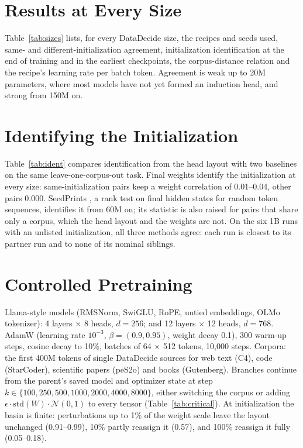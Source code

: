 \documentclass[11pt]{article}
\begin{document}
\section{Results at Every Size}
\label{app:sizes}

Table~\ref{tab:sizes} lists, for every DataDecide size, the recipes and seeds used, same- and different-initialization agreement, initialization identification at the end of training and in the earliest checkpoints, the corpus-distance relation and the recipe's learning rate per batch token.
Agreement is weak up to 20M parameters, where most models have not yet formed an induction head, and strong from 150M on.

\section{Identifying the Initialization}
\label{app:ident}

Table~\ref{tab:ident} compares identification from the head layout with two baselines on the same leave-one-corpus-out task.
Final weights identify the initialization at every size: same-initialization pairs keep a weight correlation of 0.01--0.04, other pairs 0.000.
SeedPrints \citep{tong2026seedprints}, a rank test on final hidden states for random token sequences, identifies it from 60M on; its statistic is also raised for pairs that share only a corpus, which the head layout and the weights are not.
On the six 1B runs with an unlisted initialization, all three methods agree: each run is closest to its partner run and to none of its nominal siblings.

\section{Controlled Pretraining}
\label{app:controlled}
Llama-style models (RMSNorm, SwiGLU, RoPE, untied embeddings, OLMo tokenizer): 4 layers $\times$ 8 heads, $d = 256$; and 12 layers $\times$ 12 heads, $d = 768$.
AdamW (learning rate $10^{-3}$, $\beta = (0.9, 0.95)$, weight decay 0.1), 300 warm-up steps, cosine decay to 10\%, batches of 64 $\times$ 512 tokens, 10{,}000 steps.
Corpora: the first 400M tokens of single DataDecide sources for web text (C4), code (StarCoder), scientific papers (peS2o) and books (Gutenberg).
Branches continue from the parent's saved model and optimizer state at step $k \in \{100, 250, 500, 1000, 2000, 4000, 8000\}$, either switching the corpus or adding $\epsilon \cdot \mathrm{std}(W) \cdot \mathcal{N}(0, 1)$ to every tensor (Table~\ref{tab:critical}).
At initialization the basin is finite: perturbations up to 1\% of the weight scale leave the layout unchanged (0.91--0.99), 10\% partly reassign it (0.57), and 100\% reassign it fully (0.05--0.18).
\end{document}
